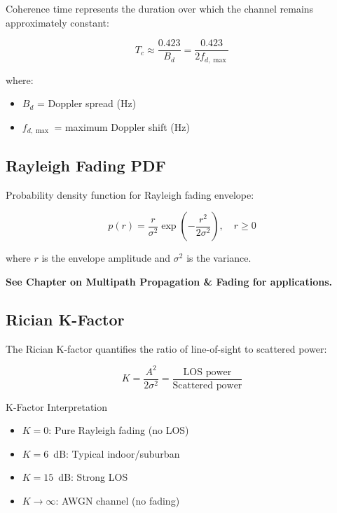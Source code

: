 Coherence time represents the duration over which the channel remains approximately constant:

\begin{equation}
\label{eq:coherence-time}
T_c \approx \frac{0.423}{B_d} = \frac{0.423}{2f_{d,\max}}
\end{equation}

where:
\begin{itemize}
\item $B_d$ = Doppler spread (Hz)
\item $f_{d,\max}$ = maximum Doppler shift (Hz)
\end{itemize}

\subsection{Rayleigh Fading PDF}
\label{subsec:rayleigh-fading}

Probability density function for Rayleigh fading envelope:

\begin{equation}
\label{eq:rayleigh-pdf}
p(r) = \frac{r}{\sigma^2} \exp\left(-\frac{r^2}{2\sigma^2}\right), \quad r \geq 0
\end{equation}

where $r$ is the envelope amplitude and $\sigma^2$ is the variance.

\textbf{See Chapter on Multipath Propagation \& Fading for applications.}

\subsection{Rician K-Factor}
\label{subsec:rician-k-factor}

The Rician K-factor quantifies the ratio of line-of-sight to scattered power:

\begin{equation}
\label{eq:rician-k-factor}
K = \frac{A^2}{2\sigma^2} = \frac{\text{LOS power}}{\text{Scattered power}}
\end{equation}

\begin{calloutbox}{K-Factor Interpretation}
\begin{itemize}
\item $K = 0$: Pure Rayleigh fading (no LOS)
\item $K = 6$~dB: Typical indoor/suburban
\item $K = 15$~dB: Strong LOS
\item $K \to \infty$: AWGN channel (no fading)
\end{itemize}
\end{calloutbox}

